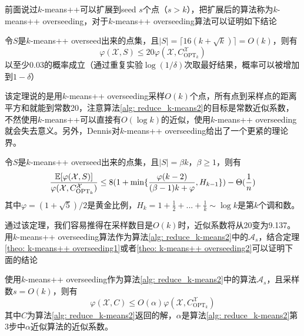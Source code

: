前面说过$k$-means++可以扩展到seed $s$个点（$s>k$），把扩展后的算法称为$k$-means++ overseeding，对于$k$-means++ overseeding算法可以证明如下结论
\begin{theorem}
    \label{theo: k-means++ overseeding1}
    令$S$是$k$-means++ overseed出来的点集，且$|S| = \lceil 16(k+\sqrt{k}) \rceil = O(k)$，则有
    \begin{equation}
        \varphi(\mathcal{X},S) \leq 20 \varphi(\mathcal{X},C_{\text{OPT}_k}^{\mathcal{X}})
    \end{equation}
    以至少0.03的概率成立（通过重复实验$\log (1/\delta)$次取最好结果，概率可以被增加到$1-\delta$）
\end{theorem}
该定理说的是用$k$-means++ overseeding采样$O(k)$个点，所有点到采样点的距离平方和就能到常数20，注意算法\ref{alg: reduce_k-means2}的目标是常数近似系数，不然使用$k$-means++可以直接有$O(\log k)$的近似，使用$k$-means++ overseeding就会失去意义。另外，Dennis对$k$-means++ overseeding给出了一个更紧的理论界。
\begin{theorem}
    \label{theo: k-means++ overseeding2}
    令$S$是$k$-means++ overseed出来的点集，且$|S| = \beta k$，$\beta \geq 1$，则有
    \begin{equation}
        \frac{\mathbb{E}[\varphi(\mathcal{X},S)]}{\varphi(\mathcal{X},C_{\text{OPT}_k}^{\mathcal{X}})} \leq 8(1+\min\{\frac{\varphi(k-2)}{(\beta -1)k + \varphi},H_{k-1}\}) - \Theta(\frac{1}{n})
    \end{equation}
    其中$\varphi = (1+\sqrt{5})/2$是黄金比例，$H_k = 1+\frac{1}{2}+...+\frac{1}{k} \sim \log k$是第$k$个调和数。
\end{theorem}
通过该定理，我们容易推得在采样数目是$O(k)$时，近似系数将从20变为9.137。
用$k$-means++ overseeding算法作为算法\ref{alg: reduce_k-means2}中的$\mathcal{A}_s$，结合定理\ref{theo: k-means++ overseeding1}或者\ref{theo: k-means++ overseeding2}可以证明下面的结论
\begin{corollary}
    使用$k$-means++ overseeding作为算法\ref{alg: reduce_k-means2}中的算法$\mathcal{A}_s$，且采样数$s = O(k)$，则有
    \begin{equation}
        \varphi(\mathcal{X},C) \leq O(\alpha) \varphi(\mathcal{X},C_{\text{OPT}_k}^{\mathcal{X}})
    \end{equation}
    其中$C$为算法\ref{alg: reduce_k-means2}返回的解，$\alpha$是算法\ref{alg: reduce_k-means2}第3步中$\alpha$近似算法的近似系数。
\end{corollary}
